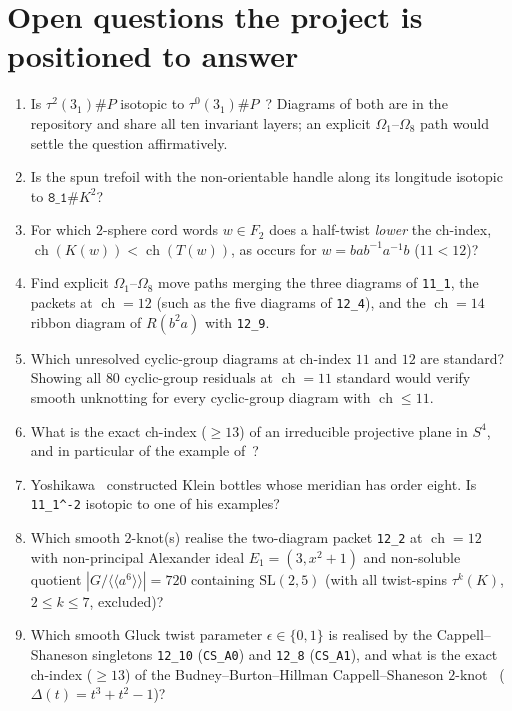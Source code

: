 \documentclass[11pt]{amsart}
\newcommand{\ch}{\operatorname{ch}}
\newcommand{\lab}[1]{\texttt{#1}}
\newcommand{\inv}{^{-1}}
\theoremstyle{plain}
\theoremstyle{remark}
\begin{document}
\section{Open questions the project is positioned to answer}

\begin{enumerate}[leftmargin=*]
\item Is $\tau^{2}(3_1)\#P$ isotopic to $\tau^{0}(3_1)\#P$~\cite[Remark~3.15]{J}? Diagrams of both are in the
repository and share all ten invariant layers; an explicit $\Omega_1$--$\Omega_8$ path would settle the
question affirmatively.
\item Is the spun trefoil with the non-orientable handle along its longitude isotopic to $\lab{8\_1}\#K^2$?
\item For which $2$-sphere cord words $w\in F_2$ does a half-twist \emph{lower} the ch-index,
$\ch(K(w))<\ch(T(w))$, as occurs for $w=bab\inv a\inv b$ ($11<12$)?
\item Find explicit $\Omega_1$--$\Omega_8$ move paths merging the three diagrams of \lab{11\_1}, the packets at
$\ch=12$ (such as the five diagrams of \lab{12\_4}), and the $\ch=14$ ribbon diagram of $R(b^2a)$ with
\lab{12\_9}.
\item Which unresolved cyclic-group diagrams at ch-index $11$ and $12$ are standard? Showing all $80$
cyclic-group residuals at $\ch=11$ standard would verify smooth unknotting for every cyclic-group diagram
with $\ch\le 11$.
\item What is the exact ch-index ($\ge 13$) of an irreducible projective plane in $S^4$, and in particular of
the example of~\cite{HKMN}?
\item Yoshikawa~\cite{Y98} constructed Klein bottles whose meridian has order eight. Is \lab{11\_1\^{}-2}
isotopic to one of his examples?
\item Which smooth $2$-knot(s) realise the two-diagram packet \lab{12\_2} at $\ch=12$ with non-principal
Alexander ideal $E_1=(3,x^2+1)$ and non-soluble quotient $|G/\langle\!\langle a^6\rangle\!\rangle|=720$
containing $\mathrm{SL}(2,5)$ (with all twist-spins $\tau^k(K)$, $2\le k\le 7$, excluded)?
\item Which smooth Gluck twist parameter $\epsilon\in\{0,1\}$ is realised by the Cappell--Shaneson singletons
\lab{12\_10} (\lab{CS\_A0}) and \lab{12\_8} (\lab{CS\_A1}), and what is the exact ch-index ($\ge 13$) of the
Budney--Burton--Hillman Cappell--Shaneson $2$-knot~\cite{BBH} ($\Delta(t)=t^3+t^2-1$)?
\end{enumerate}
\end{document}
